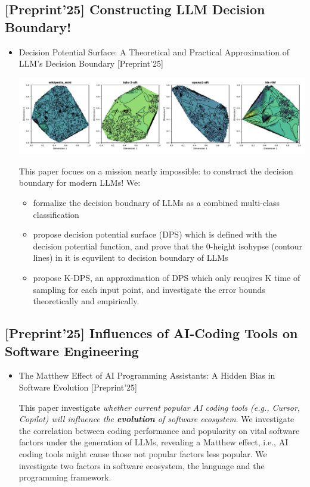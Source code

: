 \documentclass[11pt]{article}
\begin{document}
\subsection{{[}Preprint'25] Constructing LLM Decision Boundary!}
\label{sec:org4a0bfa0}
\begin{itemize}
\item Decision Potential Surface: A Theoretical and Practical Approximation of LLM's Decision Boundary [Preprint'25]

\begin{center}
\includegraphics[width=.9\linewidth]{./images/screenshot_20250927_204135.png}
\end{center} 

This paper focues on a mission nearly impossible: to construct the decision boundary for modern LLMs! We:
\begin{itemize}
\item formalize the decision boudnary of LLMs as a combined multi-class classification
\item propose decision potential surface (DPS) which is defined with the decision potential function, and prove that the 0-height isohypse (contour lines) in it is equvilent to decision boundary of LLMs
\item propose K-DPS, an approximation of DPS which only reuqires K time of sampling for each input point, and investigate the error bounds theoretically and empirically.
\end{itemize}
\end{itemize}
\subsection{{[}Preprint'25] Influences of AI-Coding Tools on Software Engineering}
\label{sec:org497f061}
\begin{itemize}
\item The Matthew Effect of AI Programming Assistants: A Hidden Bias in Software Evolution [Preprint'25]

This paper investigate \emph{whether current popular AI coding tools (e.g., Cursor, Copilot) will influence the \textbf{evolution} of software ecosystem}.
We investigate the correlation between coding performance and popularity on vital software factors under the generation of LLMs, revealing a Matthew effect, i.e., AI coding tools might cause those not popular factors less popular. We investigate two factors in software ecosystem, the language and the programming framework.
\end{itemize}
\end{document}
